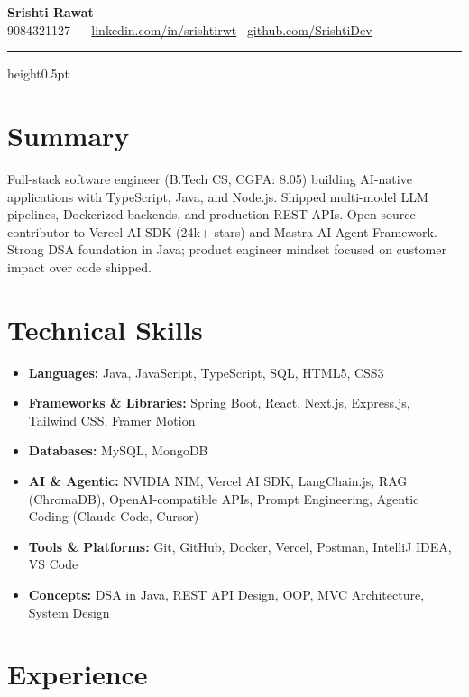 \documentclass[11pt, a4paper]{article}
\begin{document}
\pagestyle{empty}

\textbf{\LARGE Srishti Rawat}\\[6pt]

9084321127 \textbullet\  \textbullet\ \href{https://linkedin.com/in/srishtirwt}{linkedin.com/in/srishtirwt} \textbullet\ \href{https://github.com/SrishtiDev}{github.com/SrishtiDev}

\hrule height0.5pt\vskip4pt

\section*{Summary}
Full-stack software engineer (B.Tech CS, CGPA: 8.05) building AI-native applications with TypeScript, Java, and Node.js. Shipped multi-model LLM pipelines, Dockerized backends, and production REST APIs. Open source contributor to Vercel AI SDK (24k+ stars) and Mastra AI Agent Framework. Strong DSA foundation in Java; product engineer mindset focused on customer impact over code shipped.

\section*{Technical Skills}
\begin{itemize}
\item \textbf{Languages:} Java, JavaScript, TypeScript, SQL, HTML5, CSS3
\item \textbf{Frameworks \& Libraries:} Spring Boot, React, Next.js, Express.js, Tailwind CSS, Framer Motion
\item \textbf{Databases:} MySQL, MongoDB
\item \textbf{AI \& Agentic:} NVIDIA NIM, Vercel AI SDK, LangChain.js, RAG (ChromaDB), OpenAI-compatible APIs, Prompt Engineering, Agentic Coding (Claude Code, Cursor)
\item \textbf{Tools \& Platforms:} Git, GitHub, Docker, Vercel, Postman, IntelliJ IDEA, VS Code
\item \textbf{Concepts:} DSA in Java, REST API Design, OOP, MVC Architecture, System Design
\end{itemize}

\section*{Experience}
\end{document}
